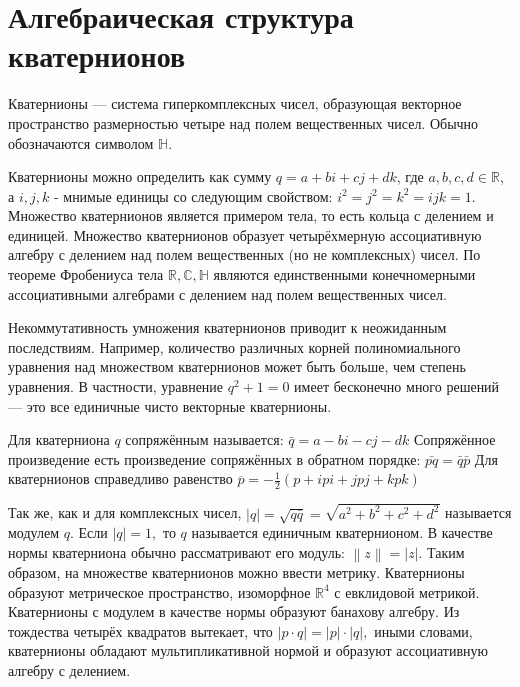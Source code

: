 \documentclass[14pt,Report]{diplomwork}
\begin{document}
				\section{Алгебраическая структура кватернионов}
					Кватернионы — система гиперкомплексных чисел, образующая векторное пространство размерностью четыре над полем вещественных чисел. Обычно обозначаются символом $\mathbb{H}$.
					\par
					Кватернионы можно определить как сумму $q = a + bi + cj + dk$, где $a,b,c,d \in \mathbb{R}$, а $i,j,k$ - мнимые единицы со следующим свойством: $i^2 = j^2 = k^2 = ijk = 1$. Множество кватернионов является примером тела, то есть кольца с делением и единицей. Множество кватернионов образует четырёхмерную ассоциативную алгебру с делением над полем вещественных (но не комплексных) чисел. По теореме Фробениуса тела 
${\mathbb{R}}, {\mathbb{C}}, {\mathbb{H}}$ являются единственными конечномерными ассоциативными алгебрами с делением над полем вещественных чисел.
					\par
					Некоммутативность умножения кватернионов приводит к неожиданным последствиям. Например, количество различных корней полиномиального уравнения над множеством кватернионов может быть больше, чем степень уравнения. В частности, уравнение $q^{2}+1=0$ имеет бесконечно много решений — это все единичные чисто векторные кватернионы.
					\par
					Для кватерниона $q$ сопряжённым называется: $\bar {q}=a-bi-cj-dk$ Сопряжённое произведение есть произведение сопряжённых в обратном порядке: ${\bar{pq}}=\bar{q}\bar{p}$ Для кватернионов справедливо равенство ${\overline {p}}=-{\frac {1}{2}}(p+ipi+jpj+kpk)$



Так же, как и для комплексных чисел,
$\displaystyle \left|q\right|={\sqrt {q{\bar {q}}}}={\sqrt {a^{2}+b^{2}+c^{2}+d^{2}}}$
называется модулем 
$\displaystyle q$. Если 
$\displaystyle \left|q\right|=1,$ то 
$\displaystyle q$ называется единичным кватернионом.
В качестве нормы кватерниона обычно рассматривают его модуль: 
$\displaystyle \left\|z\right\|=\left|z\right|$.
Таким образом, на множестве кватернионов можно ввести метрику. Кватернионы образуют метрическое пространство, изоморфное 
$\displaystyle \mathbb {R} ^{4}$ с евклидовой метрикой.
Кватернионы с модулем в качестве нормы образуют банахову алгебру.
Из тождества четырёх квадратов вытекает, что 
$\displaystyle \left|p\cdot q\right|=\left|p\right|\cdot \left|q\right|,$ иными словами, кватернионы обладают мультипликативной нормой и образуют ассоциативную алгебру с делением.
\end{document}
